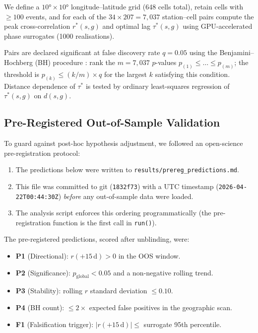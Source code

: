 \documentclass[12pt,a4paper]{article}
\begin{document}
We define a $10° \times 10°$ longitude--latitude grid (648 cells total),
retain cells with $\geq 100$ events, and for each of the $34 \times 207 = 7{,}037$
station--cell pairs compute the peak cross-correlation $r^*(s,g)$ and optimal
lag $\tau^*(s,g)$ using GPU-accelerated phase surrogates (1000 realisations).

Pairs are declared significant at false discovery rate $q = 0.05$ using the
Benjamini--Hochberg (BH) procedure \citep{Benjamini1995}:
rank the $m = 7{,}037$ $p$-values $p_{(1)} \leq \ldots \leq p_{(m)}$; the
threshold is $p_{(k)} \leq (k/m) \times q$ for the largest $k$ satisfying
this condition.
Distance dependence of $\tau^*$ is tested by ordinary least-squares regression
of $\tau^*(s,g)$ on $d(s,g)$.

\subsection{Pre-Registered Out-of-Sample Validation}
\label{sec:prereg}

To guard against post-hoc hypothesis adjustment, we followed an open-science
pre-registration protocol:
\begin{enumerate}
  \item The predictions below were written to \texttt{results/prereg\_predictions.md}.
  \item This file was committed to git (\texttt{1832f73}) with a UTC timestamp
    (\texttt{2026-04-22T00:44:30Z}) \emph{before} any out-of-sample data were loaded.
  \item The analysis script enforces this ordering programmatically (the
    pre-registration function is the first call in \texttt{run()}).
\end{enumerate}

The pre-registered predictions, scored after unblinding, were:

\begin{itemize}
  \item \textbf{P1} (Directional): $r(+15\,\text{d}) > 0$ in the OOS window.
  \item \textbf{P2} (Significance): $p_\text{global} < 0.05$ and a
    non-negative rolling trend.
  \item \textbf{P3} (Stability): rolling $r$ standard deviation $\leq 0.10$.
  \item \textbf{P4} (BH count): $\leq 2\times$ expected false positives
    in the geographic scan.
  \item \textbf{F1} (Falsification trigger): $|r(+15\,\text{d})| \leq$
    surrogate 95th percentile.
\end{itemize}
\end{document}
